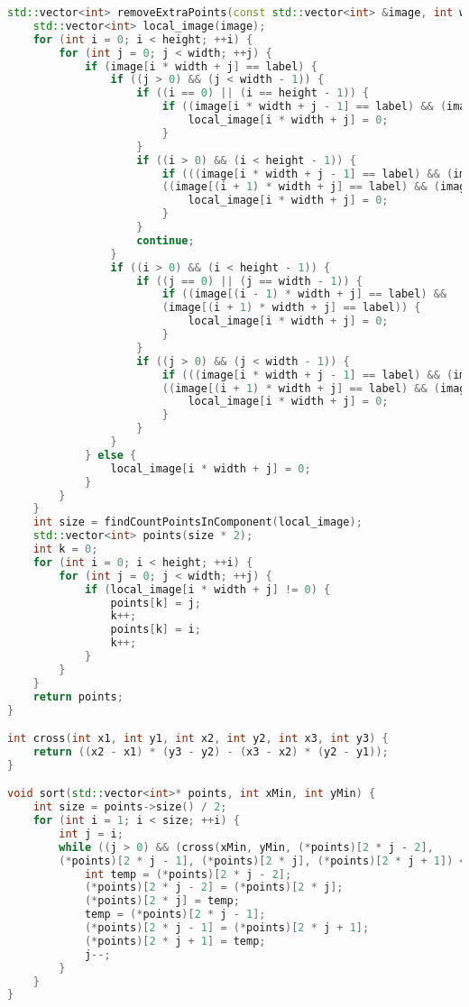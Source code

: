 \documentclass[a4paper, 12pt]{extarticle}
\begin{document}
\begin{lstlisting}[language=C++]
std::vector<int> removeExtraPoints(const std::vector<int> &image, int width, int height, int label) {
	std::vector<int> local_image(image);
	for (int i = 0; i < height; ++i) {
		for (int j = 0; j < width; ++j) {
			if (image[i * width + j] == label) {
				if ((j > 0) && (j < width - 1)) {
					if ((i == 0) || (i == height - 1)) {
						if ((image[i * width + j - 1] == label) && (image[i * width + j + 1] == label)) {
							local_image[i * width + j] = 0;
						}
					}
					if ((i > 0) && (i < height - 1)) {
						if (((image[i * width + j - 1] == label) && (image[i * width + j + 1] == label)) ||
						((image[(i + 1) * width + j] == label) && (image[(i - 1) * width + j] == label))) {
							local_image[i * width + j] = 0;
						}
					}
					continue;
				}
				if ((i > 0) && (i < height - 1)) {
					if ((j == 0) || (j == width - 1)) {
						if ((image[(i - 1) * width + j] == label) &&
						(image[(i + 1) * width + j] == label)) {
							local_image[i * width + j] = 0;
						}
					}
					if ((j > 0) && (j < width - 1)) {
						if (((image[i * width + j - 1] == label) && (image[i * width + j + 1] == label)) ||
						((image[(i + 1) * width + j] == label) && (image[(i - 1) * width + j] == label))) {
							local_image[i * width + j] = 0;
						}
					}
				}
			} else {
				local_image[i * width + j] = 0;
			}
		}
	}
	int size = findCountPointsInComponent(local_image);
	std::vector<int> points(size * 2);
	int k = 0;
	for (int i = 0; i < height; ++i) {
		for (int j = 0; j < width; ++j) {
			if (local_image[i * width + j] != 0) {
				points[k] = j;
				k++;
				points[k] = i;
				k++;
			}
		}
	}
	return points;
}

int cross(int x1, int y1, int x2, int y2, int x3, int y3) {
	return ((x2 - x1) * (y3 - y2) - (x3 - x2) * (y2 - y1));
}

void sort(std::vector<int>* points, int xMin, int yMin) {
	int size = points->size() / 2;
	for (int i = 1; i < size; ++i) {
		int j = i;
		while ((j > 0) && (cross(xMin, yMin, (*points)[2 * j - 2],
		(*points)[2 * j - 1], (*points)[2 * j], (*points)[2 * j + 1]) < 0)) {
			int temp = (*points)[2 * j - 2];
			(*points)[2 * j - 2] = (*points)[2 * j];
			(*points)[2 * j] = temp;
			temp = (*points)[2 * j - 1];
			(*points)[2 * j - 1] = (*points)[2 * j + 1];
			(*points)[2 * j + 1] = temp;
			j--;
		}
	}
}


\end{lstlisting}
\end{document}
